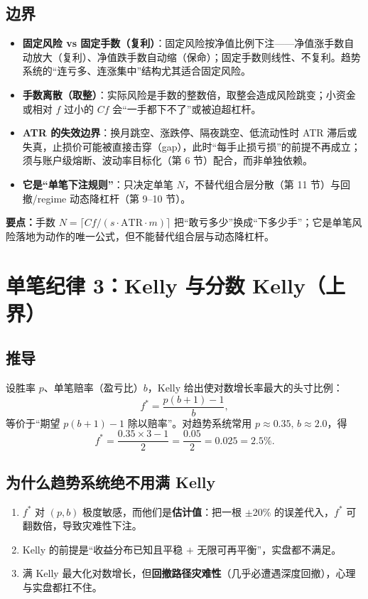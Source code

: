\documentclass[UTF8,11pt]{ctexart}
\newcommand{\takeaway}[1]{\medskip\par\noindent\textbf{要点：}#1\par\medskip}
\begin{document}
\subsection{边界}
\begin{itemize}[itemsep=2pt]
\item \textbf{固定风险 vs 固定手数（复利）}：固定风险按净值比例下注——净值涨手数自动放大（复利）、净值跌手数自动缩（保命）；固定手数则线性、不复利。趋势系统的“连亏多、连涨集中”结构尤其适合固定风险。
\item \textbf{手数离散（取整）}：实际风险是手数的整数倍，取整会造成风险跳变；小资金或相对 $f$ 过小的 $Cf$ 会“一手都下不了”或被迫超杠杆。
\item \textbf{ATR 的失效边界}：换月跳空、涨跌停、隔夜跳空、低流动性时 ATR 滞后或失真，止损价可能被直接击穿（gap），此时“每手止损亏损”的前提不再成立；须与账户级熔断、波动率目标化（第 6 节）配合，而非单独依赖。
\item \textbf{它是“单笔下注规则”}：只决定单笔 $N$，不替代组合层分散（第 11 节）与回撤/regime 动态降杠杆（第 9--10 节）。
\end{itemize}

\takeaway{手数 $N=\lceil Cf/(s\cdot\text{ATR}\cdot m)\rceil$ 把“敢亏多少”换成“下多少手”；它是单笔风险落地为动作的唯一公式，但不能替代组合层与动态降杠杆。}

\section{单笔纪律 3：Kelly 与分数 Kelly（上界）}
\subsection{推导}
设胜率 $p$、单笔赔率（盈亏比）$b$，Kelly 给出使对数增长率最大的头寸比例：
\begin{equation}
f^{*}=\frac{p(b+1)-1}{b},
\label{eq:kelly}
\end{equation}
等价于“期望 $p(b+1)-1$ 除以赔率”。对趋势系统常用 $p\approx0.35,\,b\approx2.0$，得
$$
f^{*}=\frac{0.35\times3-1}{2}=\frac{0.05}{2}=0.025 = 2.5\%.
$$
\subsection{为什么趋势系统绝不用满 Kelly}
\begin{enumerate}[itemsep=2pt]
\item $f^{*}$ 对 $(p,b)$ 极度敏感，而他们是\textbf{估计值}：把一根 $\pm$20\% 的误差代入，$f^{*}$ 可翻数倍，导致灾难性下注。
\item Kelly 的前提是“收益分布已知且平稳 $+$ 无限可再平衡”，实盘都不满足。
\item 满 Kelly 最大化对数增长，但\textbf{回撤路径灾难性}（几乎必遭遇深度回撤），心理与实盘都扛不住。
\end{enumerate}
\end{document}
